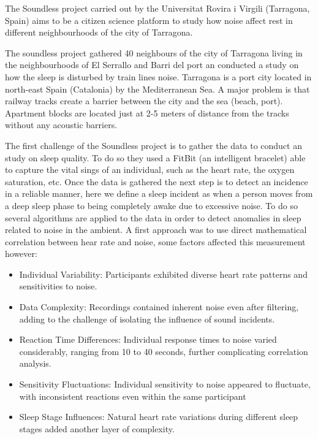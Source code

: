The Soundless \cite{soundless} project carried out by the Universitat Rovira i Virgili (Tarragona, Spain) aims to be a citizen science platform to study how noise affect rest in different neighbourhoods of the city of Tarragona. 

The soundless project gathered 40 neighbours of the city of Tarragona living in the neighbourhoods of El Serrallo and Barri del port an conducted a study on how the sleep is disturbed by train lines noise. Tarragona is a port city located in north-east Spain (Catalonia) by the Mediterranean Sea. A major problem is that railway tracks create a barrier between the city and the sea (beach, port). Apartment blocks are located just at 2-5 meters of distance from the tracks without any acoustic barriers.

The first challenge of the Soundless project is to gather the data to conduct an study on sleep quality. To do so they used a FitBit (an intelligent bracelet) able to capture the vital sings of an individual, such as the heart rate, the oxygen saturation, etc. Once the data is gathered the next step is to detect an incidence in a reliable manner, here we define a sleep incident as when a person moves from a deep sleep phase to being completely awake due to excessive noise. To do so several algorithms are applied to the data in order to detect anomalies in sleep related to noise in the ambient. A first approach was to use direct mathematical correlation between hear rate and noise, some factors affected this measurement however:

\begin{itemize}
	\item Individual Variability: Participants exhibited diverse heart rate patterns and sensitivities to noise.
	\item Data Complexity: Recordings contained inherent noise even after filtering, adding to the challenge of isolating the influence of sound incidents.
	\item Reaction Time Differences: Individual response times to noise varied considerably, ranging from 10 to 40 seconds, further complicating correlation analysis.
	\item Sensitivity Fluctuations: Individual sensitivity to noise appeared to fluctuate, with inconsistent reactions even within the same participant
	\item Sleep Stage Influences: Natural heart rate variations during different sleep stages added another layer of complexity.
\end{itemize}

